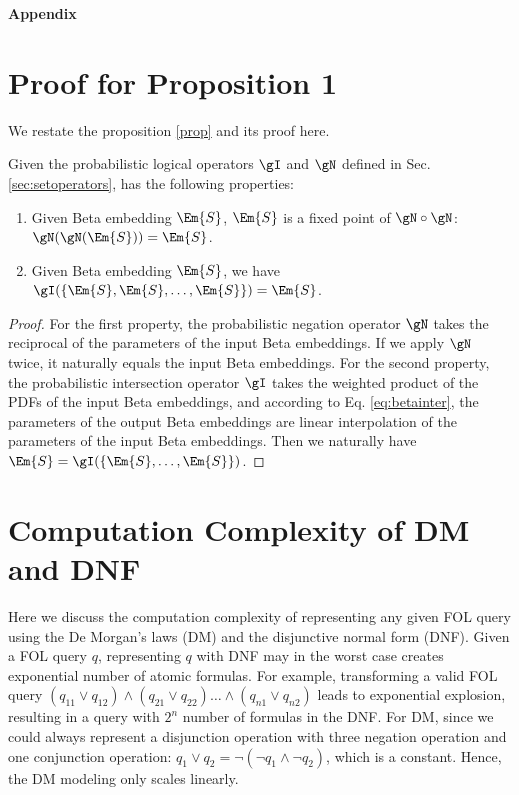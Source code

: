 \newpage

\appendix

\begin{center}
\begin{huge}
\textbf{Appendix}
\end{huge}
\end{center}

\section{Proof for Proposition 1}\label{sec:appendix-proof}
We restate the proposition \ref{prop} and its proof here.
\begin{proposition}
Given the probabilistic logical operators $\gI$ and $\gN$ defined in Sec. \ref{sec:setoperators}, \methodname has the following properties:
\begin{enumerate}
    \item Given Beta embedding $\Em{S}$, $\Em{S}$ is a fixed point of $\gN\circ\gN$: $\gN(\gN(\Em{S})) = \Em{S}$.
    \item Given Beta embedding $\Em{S}$, we have $\gI(\{\Em{S},\Em{S},\dots,\Em{S}\})=\Em{S}$.
\end{enumerate}
\end{proposition}
\begin{proof}
For the first property, the probabilistic negation operator $\gN$ takes the reciprocal of the parameters of the input Beta embeddings. If we apply $\gN$ twice, it naturally equals the input Beta embeddings. For the second property, the probabilistic intersection operator $\gI$ takes the weighted product of the PDFs of the input Beta embeddings, and according to Eq. \ref{eq:betainter}, the parameters of the output Beta embeddings are linear interpolation of the parameters of the input Beta embeddings. Then we naturally have $\Em{S}=\gI(\{\Em{S}, \dots, \Em{S}\})$.
\end{proof}

\section{Computation Complexity of DM and DNF}\label{appendix:complexity}
Here we discuss the computation complexity of representing any given FOL query using the De Morgan's laws (DM) and the disjunctive normal form (DNF). Given a FOL query $q$, representing $q$ with DNF may in the worst case creates exponential number of atomic formulas. For example, transforming a valid FOL query $(q_{11}\vee q_{12})\wedge(q_{21}\vee q_{22})\dots\wedge(q_{n1}\vee q_{n2})$ leads to exponential explosion, resulting in a query with $2^n$ number of formulas in the DNF. For DM, since we could always represent a disjunction operation with three negation operation and one conjunction operation: $q_1\vee q_2 = \neg (\neg q_1 \wedge \neg q_2)$, which is a constant. Hence, the DM modeling only scales linearly.

